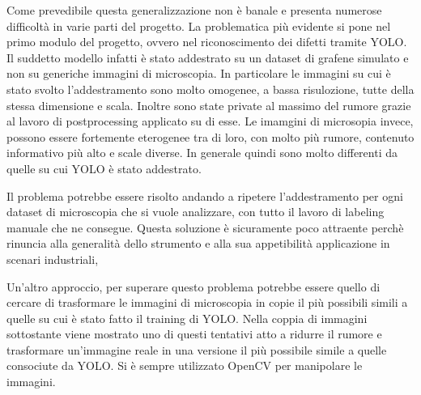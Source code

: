 \documentclass[12pt,a4paper,openright,twoside]{report}
\begin{document}
Come prevedibile questa generalizzazione non è banale e presenta numerose difficoltà in varie parti del progetto. 
La problematica più evidente si pone nel primo modulo del progetto, ovvero nel riconoscimento dei difetti tramite YOLO. Il suddetto modello infatti è stato addestrato su un dataset di grafene simulato e non su generiche immagini di microscopia. In particolare le immagini su cui è stato svolto l'addestramento sono molto omogenee, a bassa risulozione, tutte della stessa dimensione e scala. Inoltre sono state private al massimo del rumore grazie al lavoro di postprocessing applicato su di esse. Le imamgini di microsopia invece, possono essere fortemente eterogenee tra di loro, con molto più rumore, contenuto informativo più alto e scale diverse. In generale quindi sono molto differenti da quelle su cui YOLO è stato addestrato.

Il problema potrebbe essere risolto andando a ripetere l'addestramento per ogni dataset di microscopia che si vuole analizzare, con tutto il lavoro di labeling manuale che ne consegue. Questa soluzione è sicuramente poco attraente perchè rinuncia alla generalità dello strumento e alla sua appetibilità applicazione in scenari industriali,

Un'altro approccio, per superare questo problema potrebbe essere quello di cercare di trasformare le immagini di microscopia in copie il più possibili simili a quelle su cui è stato fatto il training di YOLO. 
Nella coppia di immagini sottostante viene mostrato uno di questi tentativi atto a ridurre il rumore e trasformare un'immagine reale in una versione il più possibile simile a quelle consociute da YOLO. Si è sempre utilizzato OpenCV per manipolare le immagini.  
\end{document}
